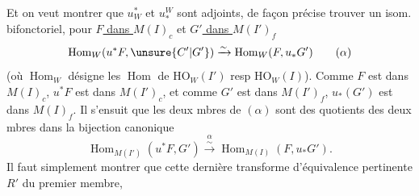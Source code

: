 Et on veut montrer que $u_W^*$ et $u_*^W$ sont adjoints, de façon précise trouver un isom. bifonctoriel, pour \uline{$F$ dans $M(I)_c$} et \uline{$G'$ dans $M(I')_f$} 
\[
\operatorname{Hom}_W(u^*F,\unsure{C'|G'})\xrightarrow{\sim}\operatorname{Hom}_W(F,u_*G')
\tag*{($\alpha$)}
\]
(où $\operatorname{Hom}_W$ désigne les $\operatorname{Hom}$ de $\mathrm{HO}_W(I')$ resp $\mathrm{HO}_W(I)$). Comme $F$ est dans $M(I)_c$, $u^*F$ est dans $M(I')_c$, et comme $G'$ est dans $M(I')_f$, $u_*(G')$ est dans $M(I)_f$. Il s'ensuit que les deux mbres de $(\alpha)$ sont des quotients des deux mbres dans la bijection canonique
\[
\operatorname{Hom}_{M(I')}(u^*F,G')\overset{\alpha}{\xrightarrow{\sim}}\operatorname{Hom}_{M(I)}(F,u_*G').
\tag*{($\alpha\alpha$)}
\]
Il faut simplement montrer que cette dernière transforme  d'équivalence pertinente $R'$ du premier membre,
